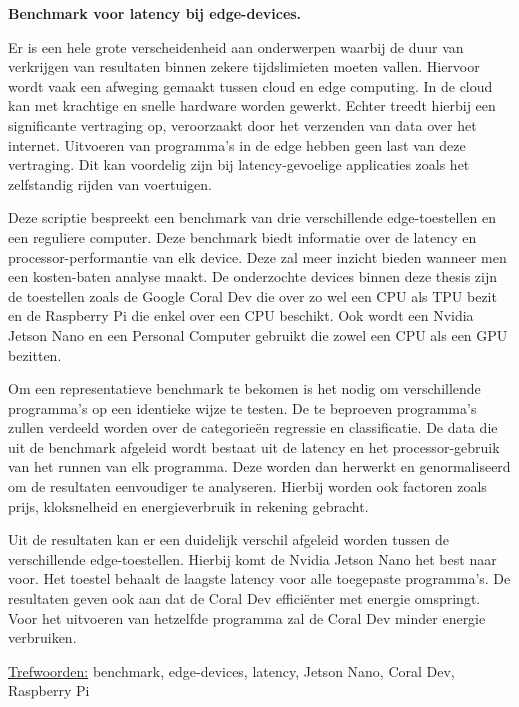 \textbf{Benchmark voor latency bij edge-devices.}

Er is een hele grote verscheidenheid aan onderwerpen waarbij de duur van verkrijgen van resultaten binnen zekere tijdslimieten moeten vallen. Hiervoor wordt vaak een afweging gemaakt tussen cloud en edge computing. In de cloud kan met krachtige en snelle hardware worden gewerkt. Echter treedt hierbij een significante vertraging op, veroorzaakt door het verzenden van data over het internet. Uitvoeren van programma's in de edge hebben geen last van deze vertraging. Dit kan voordelig zijn bij latency-gevoelige applicaties zoals het zelfstandig rijden van voertuigen. 

Deze scriptie bespreekt een benchmark van drie verschillende edge-toestellen en een reguliere computer. Deze benchmark biedt informatie over de latency en processor-performantie van elk device. Deze zal meer inzicht bieden wanneer men een kosten-baten analyse maakt. De onderzochte devices binnen deze thesis zijn de toestellen zoals de Google Coral Dev die over zo wel een CPU als TPU bezit en de Raspberry Pi die enkel over een CPU beschikt. Ook wordt een Nvidia Jetson Nano en een Personal Computer gebruikt die zowel een CPU als een GPU bezitten.

Om een representatieve benchmark te bekomen is het nodig om verschillende programma's op een identieke wijze te testen. De te beproeven programma's zullen verdeeld worden over de categorie\"en regressie en classificatie. De data die uit de benchmark afgeleid wordt bestaat uit de latency en het processor-gebruik van het runnen van elk programma. Deze worden dan herwerkt en genormaliseerd om de resultaten eenvoudiger te analyseren. Hierbij worden ook factoren zoals prijs, kloksnelheid en energieverbruik in rekening gebracht.

Uit de resultaten kan er een duidelijk verschil afgeleid worden tussen de verschillende edge-toestellen. Hierbij komt de Nvidia Jetson Nano het best naar voor. Het toestel behaalt de laagste latency voor alle toegepaste programma's. De resultaten geven ook aan dat de Coral Dev effici\"enter met energie omspringt. Voor het uitvoeren van hetzelfde programma zal de Coral Dev minder energie verbruiken.


\underline{Trefwoorden:} benchmark, edge-devices, latency, Jetson Nano, Coral Dev, Raspberry Pi